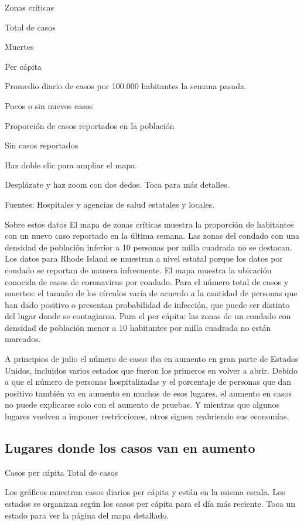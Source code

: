 Zonas críticas

Total de casos

Muertes

Per cápita

Promedio diario de casos por 100.000 habitantes la semana pasada.

Pocos o sin nuevos casos

Proporción de casos reportados en la población

Sin casos reportados

Haz doble clic para ampliar el mapa.

Desplázate y haz zoom con dos dedos. Toca para más detalles.

Fuentes: Hospitales y agencias de salud estatales y locales.

Sobre estos datos El mapa de zonas críticas muestra la proporción de
habitantes con un nuevo caso reportado en la última semana. Las zonas
del condado con una densidad de población inferior a 10 personas por
milla cuadrada no se destacan. Los datos para Rhode Island se muestran a
nivel estatal porque los datos por condado se reportan de manera
infrecuente. El mapa muestra la ubicación conocida de casos de
coronavirus por condado. Para el número total de casos y muertes: el
tamaño de los círculos varía de acuerdo a la cantidad de personas que
han dado positivo o presentan probabilidad de infección, que puede ser
distinto del lugar donde se contagiaron. Para el per cápita: las zonas
de un condado con densidad de población menor a 10 habitantes por milla
cuadrada no están marcados.

A principios de julio el número de casos iba en aumento en gran parte de
Estados Unidos, incluidos varios estados que fueron los primeros en
volver a abrir. Debido a que el número de personas hospitalizadas y el
porcentaje de personas que dan positivo también va en aumento en muchos
de esos lugares, el aumento en casos no puede explicarse solo con el
aumento de pruebas. Y mientras que algunos lugares vuelven a imponer
restricciones, otros siguen reabriendo sus economías.

\hypertarget{lugares-donde-los-casos-van-en-aumento}{%
\subsection{Lugares donde los casos van en
aumento}\label{lugares-donde-los-casos-van-en-aumento}}

Casos per cápita Total de casos

Los gráficos muestran casos diarios per cápita y están en la misma
escala. Los estados se organizan según los casos per cápita para el día
más reciente. Toca un estado para ver la página del mapa detallado.

